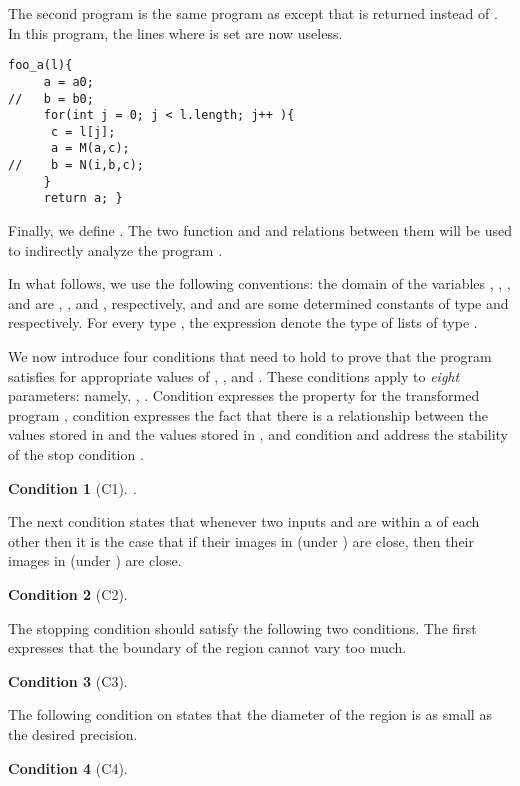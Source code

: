 \documentclass[copyright,creativecommons]{eptcs}
\newtheorem{hypo}{Condition}[section]
\newcommand{\Cone}{C1}
\newcommand{\Ctwo}{C2}
\newcommand{\Cthree}{C3}
\newcommand{\Cfour}{C4}
\begin{document}
The second program  is the same program as  except
that  is returned instead of . In this program, the lines where
 is set are now useless. 
\begin{lstlisting}[language=pscode]
foo_a(l){
     a = a0;
//   b = b0;
     for(int j = 0; j < l.length; j++ ){
	  c = l[j];
	  a = M(a,c);
//	  b = N(i,b,c);
     }
     return a; }
\end{lstlisting}
Finally, we define . 
The two function  and  and relations between them will
be used to indirectly analyze the program .



In what follows, we use the following conventions: the domain of the
variables , , , and  are , ,  and ,
respectively, and  and  are some determined constants of type
 and  respectively.  For every type , the expression 
denote the type of lists of type .

We now introduce four conditions that need to hold to prove that the
 program satisfies  for appropriate
values of , , and .  These conditions apply to
{\em eight} parameters: namely, ,
.  Condition  expresses the property
 for the transformed program , condition
 expresses the fact that there is a relationship between the
values stored in  and the values stored in , and condition
 and  address the stability of the stop condition
.

\begin{hypo}[\Cone]\label{C1} \quad
.
\end{hypo}



The next condition states that whenever two inputs  and  are
within a  of each other then it is the case that if their
images in  (under )  are close, then their images in 
(under ) are close.

\begin{hypo}[\Ctwo]\label{C2}

\end{hypo}


The stopping condition  should satisfy the following two
conditions.  The first expresses that the boundary of the region  cannot vary too much.
\begin{hypo}[\Cthree]\label{C3}

\end{hypo}

The following condition on  states that the diameter of the region
 is as small as the desired precision.
\begin{hypo}[\Cfour]\label{C4}

\end{hypo}
\end{document}
